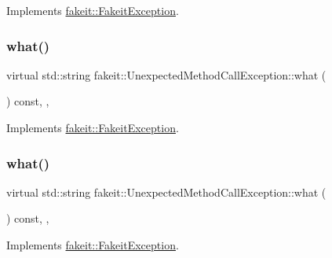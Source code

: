 Implements \mbox{\hyperlink{structfakeit_1_1FakeitException_a02ef6315b98e4382157c2106a62f7718}{fakeit\+::\+Fakeit\+Exception}}.

\mbox{\label{structfakeit_1_1UnexpectedMethodCallException_aabd833b1856e1cf842d2eafc3abf0a0e}} 
\subsubsection{\texorpdfstring{what()}{what()}\hspace{0.1cm}{\footnotesize\ttfamily [5/9]}}
{\footnotesize\ttfamily virtual std\+::string fakeit\+::\+Unexpected\+Method\+Call\+Exception\+::what (\begin{DoxyParamCaption}{ }\end{DoxyParamCaption}) const\hspace{0.3cm}{\ttfamily [inline]}, {\ttfamily [override]}, {\ttfamily [virtual]}}



Implements \mbox{\hyperlink{structfakeit_1_1FakeitException_a02ef6315b98e4382157c2106a62f7718}{fakeit\+::\+Fakeit\+Exception}}.

\mbox{\label{structfakeit_1_1UnexpectedMethodCallException_aabd833b1856e1cf842d2eafc3abf0a0e}} 
\subsubsection{\texorpdfstring{what()}{what()}\hspace{0.1cm}{\footnotesize\ttfamily [6/9]}}
{\footnotesize\ttfamily virtual std\+::string fakeit\+::\+Unexpected\+Method\+Call\+Exception\+::what (\begin{DoxyParamCaption}{ }\end{DoxyParamCaption}) const\hspace{0.3cm}{\ttfamily [inline]}, {\ttfamily [override]}, {\ttfamily [virtual]}}



Implements \mbox{\hyperlink{structfakeit_1_1FakeitException_a02ef6315b98e4382157c2106a62f7718}{fakeit\+::\+Fakeit\+Exception}}.

